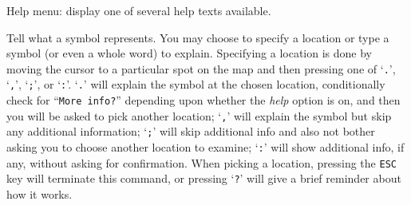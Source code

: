\blist{}
\item[\tb{?}]
Help menu:  display one of several help texts available.
\item[\tb{/}]
Tell what a symbol represents.  You may choose to specify a location
or type a symbol (or even a whole word) to explain.
Specifying a location is done by moving the cursor to a particular spot
on the map and then pressing one of `{\tt .}', `{\tt ,}', `{\tt ;}',
or `{\tt :}'.  `{\tt .}' will explain the symbol at the chosen location,
conditionally check for ``{\tt More info?}'' depending upon whether the
{\it help\/}
option is on, and then you will be asked to pick another location;
`{\tt ,}' will explain the symbol but skip any additional
information; `{\tt ;}' will skip additional info and also not bother asking
you to choose another location to examine; `{\tt :}' will show additional
info, if any, without asking for confirmation.  When picking a location,
pressing the {\tt ESC} key will terminate this command, or pressing `{\tt ?}'
will give a brief reminder about how it works.


